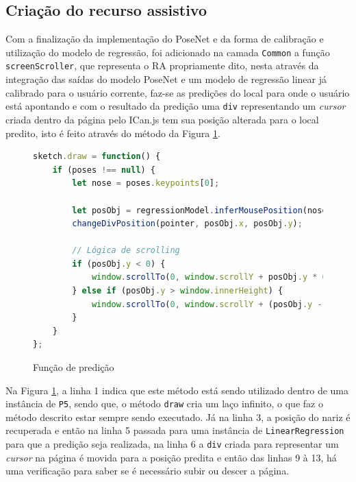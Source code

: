 \subsection{Criação do recurso assistivo}

\par Com a finalização da implementação do PoseNet e da forma de calibração e utilização do modelo de regressão, foi adicionado na camada \texttt{Common} a função \texttt{screenScroller}, que representa o RA propriamente dito, nesta através da integração das saídas do modelo PoseNet e um modelo de regressão linear já calibrado para o usuário corrente, faz-se as predições do local para onde o usuário está apontando e com o resultado da predição uma \texttt{div} representando um \textit{cursor} criada dentro da página pelo ICan.js tem sua posição alterada para o local predito, isto é feito através do método da Figura \ref{figure:funcao_predicao}.

\begin{figure}[H]
    \centering
    \caption{Função de predição}
    \begin{lstlisting}[language=JavaScript]
sketch.draw = function() {
    if (poses !== null) {
        let nose = poses.keypoints[0];

        let posObj = regressionModel.inferMousePosition(nose);
        changeDivPosition(pointer, posObj.x, posObj.y);

        // Lógica de scrolling
        if (posObj.y < 0) {
            window.scrollTo(0, window.scrollY + posObj.y * 0.05);
        } else if (posObj.y > window.innerHeight) {
            window.scrollTo(0, window.scrollY + (posObj.y - window.innerHeight) * 0.03);
        }
    }
};
    \end{lstlisting}
    \label{figure:funcao_predicao}
\end{figure}

\par Na Figura \ref{figure:funcao_predicao}, a linha 1 indica que este método está sendo utilizado dentro de uma instância de \texttt{P5}, sendo que, o método \texttt{draw} cria um laço infinito, o que faz o método descrito estar sempre sendo executado. Já na linha 3, a posição do nariz é recuperada e então na linha 5 passada para uma instância de \texttt{LinearRegression} para que a predição seja realizada, na linha 6 a \texttt{div} criada para representar um \textit{cursor} na página é movida para a posição predita e então das linhas 9 à 13, há uma verificação para saber se é necessário subir ou descer a página.

